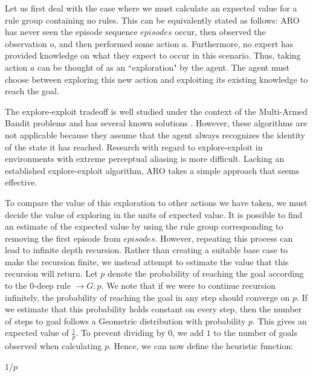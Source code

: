 \documentclass[letterpaper]{article} %
\begin{document}
Let us first deal with the case where we must calculate an expected
value for a rule group containing no rules. This can be equivalently
stated as follows: ARO has never seen the episode sequence $episodes$
occur, then observed the observation $o$, and then performed some
action $a$. Furthermore, no expert has provided knowledge on what they
expect to occur in this scenario. Thus, taking action $a$ can be
thought of as an ``exploration" by the agent. The agent must choose
between exploring this new action and exploiting its existing
knowledge to reach the goal.

The explore-exploit tradeoff is well studied under the context of the
Multi-Armed Bandit problems \cite{Berry85} and has several known
solutions \cite{Sutton98,Kearns02,Brafman02}.  However, these
algorithms are not applicable because they assume that the agent
always recognizes the identity of the state it has reached.  Research
with regard to explore-exploit in environments with extreme perceptual
aliasing is more difficult.  Lacking an established explore-exploit
algorithm, ARO takes a simple approach that seems effective.

To compare the value of this exploration to other actions we have
taken, we must decide the value of exploring in the units of expected
value.  It is possible to find an estimate of the expected value by
using the rule group corresponding to removing the first episode from
$episodes$. However, repeating this process can lead to infinite depth
recursion. Rather than creating a suitable base case to make the
recursion finite, we instead attempt to estimate the value that this
recursion will return. Let $p$ denote the probability of reaching the
goal according to the $0$-deep rule $\rightarrow G : p$. We note that
if we were to continue recursion infinitely, the probability of
reaching the goal in any step should converge on $p$. If we estimate
that this probability holds constant on every step, then the number of
steps to goal follows a Geometric distribution with probability
$p$. This gives an expected value of $\frac{1}{p}$. To prevent
dividing by $0$, we add $1$ to the number of goals observed when
calculating $p$. Hence, we can now define the heuristic function:

\begin{algorithmic}[-1]
	
		\State \Return $1/p$
	\EndFunction
	
\end{algorithmic}
\end{document}
